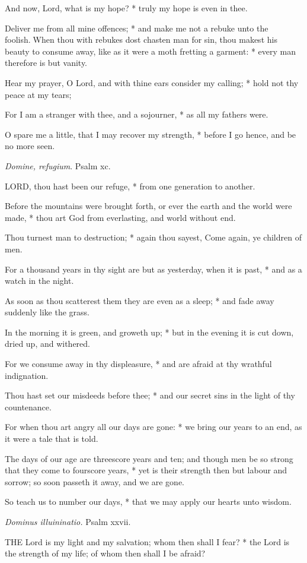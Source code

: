 And now, Lord, what is my hope? * truly my hope is
even in thee.

Deliver me from all mine offences; * and make me not
a rebuke unto the foolish.When thou with rebukes dost chasten man for
sin, thou makest his beauty to consume away, like as it were a moth fretting
a garment: * every man therefore is but vanity.

Hear my prayer, O Lord, and with thine ears consider
my calling; * hold not thy peace at my tears;

For I am a stranger with thee, and a sojourner, * as
all my fathers were.

O spare me a little, that I may recover my strength,
* before I go hence, and be no more seen.

\emph{Domine,
refugium}. Psalm xc.

LORD,
thou hast been our refuge, * from one generation to another.

Before the mountains were brought forth, or ever the
earth and the world were made, * thou art God from everlasting, and world
without end.

Thou turnest man to destruction; * again thou sayest,
Come again, ye children of men.

For a thousand years in thy sight are but as yesterday,
when it is past, * and as a watch in the night.

As soon as thou scatterest them they are even as a
sleep; * and fade away suddenly like the grass.

In the morning it is green, and groweth up; * but in
the evening it is cut down, dried up, and withered.

For we consume away in thy displeasure, * and are afraid
at thy wrathful indignation.

Thou hast set our misdeeds before thee; * and our secret
sins in the light of thy countenance.

For when thou art angry all our days are gone: * we
bring our years to an end, as it were a tale that is told.

The days of our age are threescore years and ten; and
though men be so strong that they come to fourscore years, * yet is their
strength then but labour and sorrow; so soon passeth it away, and we are
gone.

So teach us to number our days, * that we may apply
our hearts unto wisdom.

\emph{Dominus
illuininatio.}
Psalm xxvii.

THE
Lord is my light and my salvation; whom then shall I fear? * the Lord
is the strength of my life; of whom then shall I be afraid?

